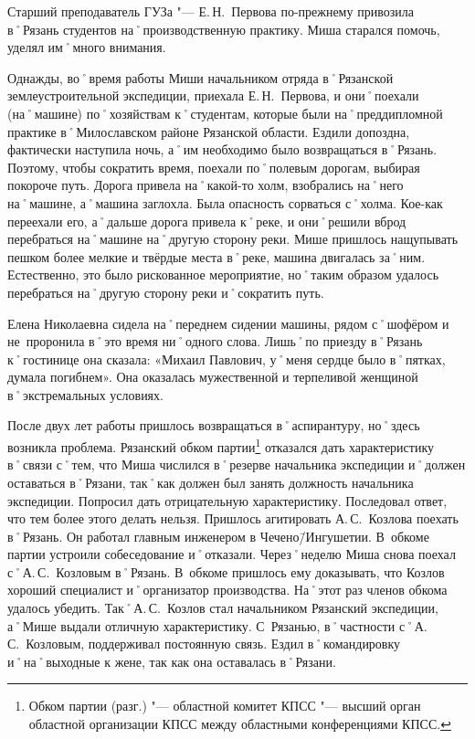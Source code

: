 Старший преподаватель ГУЗа "--- Е.\,Н.~Первова по-прежнему привозила в˚Рязань студентов на˚производственную практику. Миша старался помочь, уделял им˚много внимания.

Однажды, во˚время работы Миши начальником отряда в˚Рязанской землеустроительной экспедиции, приехала Е.\,Н.~Первова, и они˚поехали (на˚машине) по˚хозяйствам к˚студентам, которые были на˚преддипломной практике в˚Милославском районе Рязанской области. Ездили допоздна, фактически наступила ночь, а˚им необходимо было возвращаться в˚Рязань. Поэтому, чтобы сократить время, поехали по˚полевым дорогам, выбирая покороче путь. Дорога привела на˚какой-то холм, взобрались на˚него на˚машине, а˚машина заглохла. Была опасность сорваться с˚холма. Кое-как переехали его, а˚дальше дорога привела к˚реке, и они˚решили вброд перебраться на˚машине на˚другую сторону реки. Мише пришлось нащупывать пешком более мелкие и твёрдые места в˚реке, машина двигалась за˚ним. Естественно, это было рискованное мероприятие, но˚таким образом удалось перебраться на˚другую сторону реки и˚сократить путь. 

Елена Николаевна сидела на˚переднем сидении машины, рядом с˚шофёром и не~проронила в˚это время ни˚одного слова. Лишь˚по приезду в˚Рязань к˚гостинице она сказала: «Михаил Павлович, у˚меня сердце было в˚пятках, думала погибнем». Она оказалась мужественной и терпеливой женщиной в˚экстремальных условиях.

После двух лет работы пришлось возвращаться в˚аспирантуру, но˚здесь возникла проблема. Рязанский обком партии\footnote{Обком партии (разг.) "--- областной комитет КПСС "--- высший орган областной организации КПСС между областными конференциями КПСС.} отказался дать характеристику в˚связи с˚тем, что Миша числился в˚резерве начальника экспедиции и˚должен оставаться в˚Рязани, так˚как должен был занять должность начальника экспедиции. Попросил дать отрицательную характеристику. Последовал ответ, что тем более этого делать нельзя. Пришлось агитировать А.\,С.~Козлова поехать в˚Рязань. Он работал главным инженером в Чечено\=/Ингушетии. В~обкоме партии устроили собеседование и˚отказали. Через˚неделю Миша снова поехал с˚А.\,С.~Козловым в˚Рязань. В~обкоме пришлось ему доказывать, что Козлов хороший специалист и˚организатор производства. На˚этот раз членов обкома удалось убедить. Так˚А.\,С.~Козлов стал начальником Рязанский экспедиции, а˚Мише выдали отличную характеристику. С~Рязанью, в˚частности с˚А.\,С.~Козловым, поддерживал постоянную связь. Ездил в˚командировку и˚на˚выходные к жене, так как она оставалась в˚Рязани.